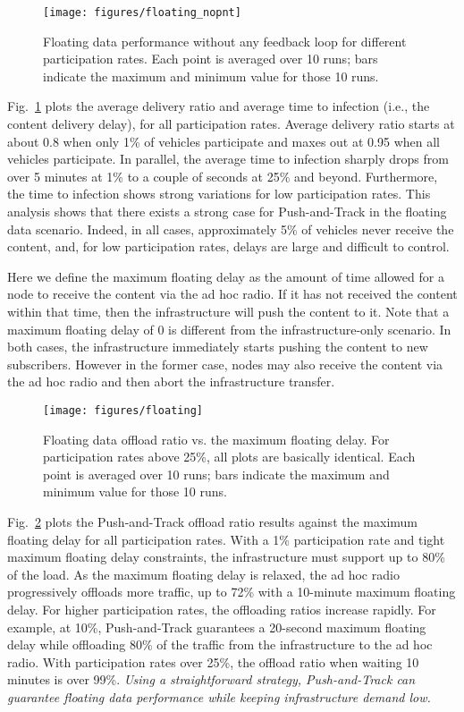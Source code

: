 \documentclass[preprint]{elsarticle}
\begin{document}
\begin{figure}[t]
  \centering
  \texttt{[image: figures/floating\_nopnt]}
  \caption{Floating data performance without any feedback loop for different participation rates. Each point is averaged over 10 runs; bars indicate the maximum and minimum value for those 10 runs.}
  \label{fig:floating_nopnt}
\end{figure}

Fig.~\ref{fig:floating_nopnt} plots the average delivery ratio and average time to infection (i.e., the content delivery delay), for all participation rates. Average delivery ratio starts at about 0.8 when only 1\% of vehicles participate and maxes out at 0.95 when all vehicles participate. In parallel, the average time to infection sharply drops from over 5 minutes at 1\% to a couple of seconds at 25\% and beyond. Furthermore, the time to infection shows strong variations for low participation rates. This analysis shows that there exists a strong case for Push-and-Track in the floating data scenario. Indeed, in all cases, approximately 5\% of vehicles never receive the content, and, for low participation rates, delays are large and difficult to control.

Here we define the maximum floating delay as the amount of time allowed for a node to receive the content via the ad hoc radio. If it has not received the content within that time, then the infrastructure will push the content to it. Note that a maximum floating delay of $0$ is different from the infrastructure-only scenario. In both cases, the infrastructure immediately starts pushing the content to new subscribers. However in the former case, nodes may also receive the content via the ad hoc radio and then abort the infrastructure transfer.

\begin{figure}[t]
  \centering
  \texttt{[image: figures/floating]}
  \caption{Floating data offload ratio vs. the maximum floating delay. For participation rates above 25\%, all plots are basically identical. Each point is averaged over 10 runs; bars indicate the maximum and minimum value for those 10 runs.}
  \label{fig:floating}
\end{figure}

Fig.~\ref{fig:floating} plots the Push-and-Track offload ratio results against the maximum floating delay for all participation rates. With a 1\% participation rate and tight maximum floating delay constraints, the infrastructure must support up to 80\% of the load. As the maximum floating delay is relaxed, the ad hoc radio progressively offloads more traffic, up to 72\% with a 10-minute maximum floating delay. For higher participation rates, the offloading ratios increase rapidly. For example, at 10\%, Push-and-Track guarantees a 20-second maximum floating delay while offloading 80\% of the traffic from the infrastructure to the ad hoc radio. With participation rates over 25\%, the offload ratio when waiting 10 minutes is over 99\%. \emph{Using a straightforward strategy, Push-and-Track can guarantee floating data performance while keeping infrastructure demand low.}
\end{document}
